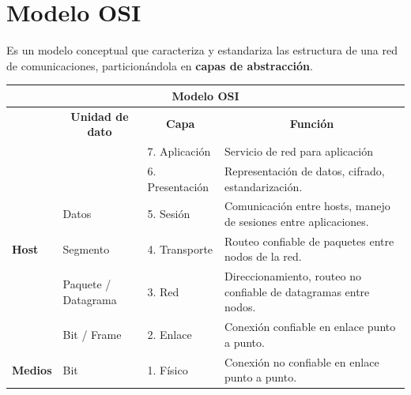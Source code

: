 \documentclass[]{article}
\begin{document}
\section{Modelo OSI}
Es un modelo conceptual que caracteriza y estandariza las estructura de una red de comunicaciones, particionándola en \textbf{capas de abstracción}.

\begin{center}
    \begin{table}[h]
        \begin{tabular}{|p{2cm}|l|l|p{8cm}|}
            \hline
            \multicolumn{4}{|c|}{\textbf{\large{Modelo OSI}}}                                                                                                                                                                                         \\ \hline
            \multicolumn{1}{|l|}{}                     & \multicolumn{1}{c|}{\textbf{Unidad de dato}}    & \multicolumn{1}{c|}{\textbf{Capa}}      & \multicolumn{1}{c|}{\textbf{Función}}                                                    \\ \hline
                                                       &                         & 7. Aplicación   & Servicio de red para aplicación                                  \\ \cline{3-4}
                                                       &                         & 6. Presentación & Representación de datos, cifrado, estandarización.               \\ \cline{3-4}
                                                       & \multirow{-3}{*}{Datos} & 5. Sesión       & Comunicación entre hosts, manejo de sesiones entre aplicaciones. \\ \cline{2-4}
            \multirow{-4}{*}{\textbf{Host}}            & Segmento                & 4. Transporte   & Routeo confiable de paquetes entre nodos de la red.              \\ \hline
                                                       & Paquete / Datagrama     & 3. Red          & Direccionamiento, routeo no confiable de datagramas entre nodos. \\ \cline{2-4}
                                                       & Bit / Frame             & 2. Enlace       & Conexión confiable en enlace punto a punto.                      \\ \cline{2-4}
            \multirow{-3}{*}{\textbf{Medios}}          & Bit                     & 1. Físico       & Conexión no confiable en enlace punto a punto.                   \\ \hline
        \end{tabular}
    \end{table}
\end{center}
\end{document}
